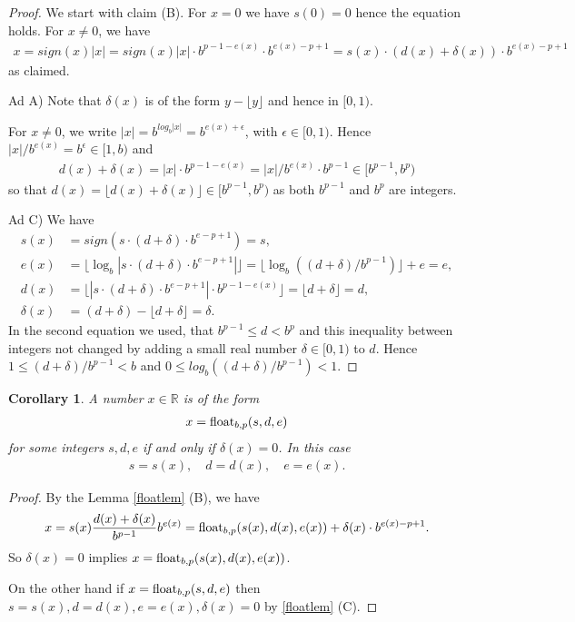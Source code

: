 \documentclass{article}
\theoremstyle{plain}
\newtheorem{corollary}[definition]{Corollary}
\newcommand{\IR}{\mathbb{R}}
\newcommand{\floor}[1]{\lfloor#1\rfloor}
\newcommand{\abs}[1]{|#1|}
\newcommand{\eps}{\epsilon}
\begin{document}
\begin{proof}
  We start with claim (B). For $x=0$ we have $s(0) = 0$ hence the equation holds.
  For $x \neq 0$, we have
  \begin{align*}
    x = sign(x) |x| = sign(x) \abs{x} \cdot b^{p-1-e(x)} \cdot b^{e(x)-p+1} = s(x) \cdot (d(x) + \delta(x)) \cdot b^{e(x)-p+1}
  \end{align*}
  as claimed.

  Ad A) Note that $\delta(x)$ is of the form $y - \floor{y}$ and hence in $[0,1)$.

  For $x \neq 0$, we write $|x| = b^{log_b|x|} = b^{e(x) + \eps}$, with $\eps \in [0,1)$.
  Hence $\abs{x} / b^{e(x)} = b^\eps \in [1,b)$ and
  \begin{align*}
     d(x) + \delta(x) = \abs{x} \cdot b^{p-1-e(x)} = \abs{x} / b^{e(x)} \cdot b^{p-1} \in [b^{p-1},b^p)
  \end{align*}
  so that
  $d(x) = \floor{d(x) + \delta(x)} \in [ b^{p-1}, b^p )$
  as both $b^{p-1}$ and $b^p$ are integers.

  Ad C) We have
  \begin{align*}
    s(x) &= sign(s \cdot (d + \delta) \cdot b^{e-p+1}) = s, \\
    e(x) &= \floor{ \log_b \abs{s \cdot (d + \delta) \cdot b^{e-p+1}} } = \floor{\log_b((d+\delta)/b^{p-1})} + e = e, \\
    d(x) &= \floor{\abs{ s \cdot (d + \delta) \cdot b^{e-p+1} } \cdot b^{p-1-e(x)}} = \floor{d + \delta} = d, \\
    \delta(x) &= (d + \delta) - \floor{d + \delta} = \delta.
  \end{align*}
  In the second equation we used, that $b^{p-1} \leq d < b^p$ and this inequality between integers
  not changed by adding a small real number $\delta \in [0,1)$ to $d$.
  Hence $1 \leq (d+\delta) /  b^{p-1} < b$ and $0 \leq log_b((d+\delta) /  b^{p-1}) < 1$.
\end{proof}

\begin{corollary}
  A number $x \in \IR$ is of the form
  \begin{align*}
    x = \mathrm{float}_{b,p}(s,d,e)
  \end{align*}
  for some integers $s,d,e$ if and only if $\delta(x) = 0$.
  In this case
  \begin{align*}
    s = s(x), \quad d = d(x), \quad e = e(x).
  \end{align*}
\end{corollary}
\begin{proof}
  By the Lemma \ref{floatlem} (B), we have
  \begin{align*}
    x = s(x) \frac{d(x) + \delta(x)}{b^{p-1}} b^{e(x)} = \mathrm{float}_{b,p}(s(x), d(x), e(x)) + \delta(x) \cdot b^{e(x) - p + 1}.
  \end{align*}
  So $\delta(x) = 0$ implies $x = \mathrm{float}_{b,p}(s(x),d(x),e(x))$.

  On the other hand if $x = \mathrm{float}_{b,p}(s,d,e)$ then $s = s(x), d = d(x), e = e(x), \delta(x) = 0$ by \ref{floatlem} (C).
\end{proof}
\end{document}
